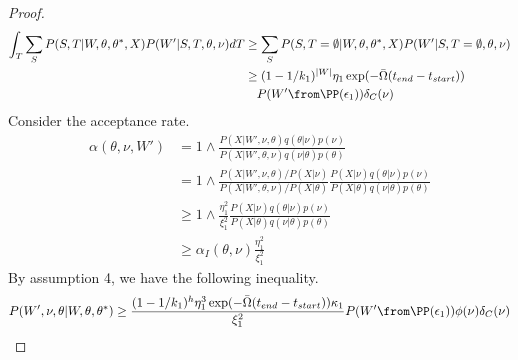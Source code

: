 \begin{proof}
\begin{align*}
\int_T \sum_S P(S,T | W, \theta, \theta^*, X) P(W'| S, T, \theta, \nu)dT &\geq \sum_S P(S, T = \emptyset | W, \theta, \theta^*, X) P(W' | S, T=\emptyset,\theta, \nu)\\
& \geq (1 - 1/k_1)^{|W|}\eta_1 \exp(-\bar{\Omega}(t_{end} - t_{start})) \\
& \quad P(W' \from \PP(\epsilon_1))\delta_C(\nu)
\end{align*}
Consider the acceptance rate.
\begin{align*}
\alpha(\theta, \nu, W') &= 1 \wedge \frac{P(X | W', \nu, \theta) q(\theta|\nu)p(\nu)}{P(X | W', \theta, \nu)q(\nu|\theta)p(\theta)}\\
&= 1 \wedge \frac{P(X|W', \nu, \theta) / P(X|\nu)}{P(X|W', \theta, \nu) / P(X|\theta)} \frac{P(X | \nu) q(\theta|\nu)p(\nu)}{P(X | \theta)q(\nu|\theta)p(\theta)}\\
& \geq 1 \wedge \frac{\eta_1^2}{\xi_1^2} 	\frac{P(X | \nu) q(\theta|\nu)p(\nu)}{P(X | \theta)q(\nu|\theta)p(\theta)}\\
& \geq \alpha_I(\theta, \nu)\frac{\eta_1^2}{\xi_1^2}
\end{align*}
By assumption 4, we have the following inequality.
\begin{align*}
P(W', \nu, \theta | W, \theta, \theta^*) \geq \frac{(1 - 1/k_1)^{h}
\eta_1^3 \exp(-\bar{\Omega}(t_{end} - t_{start}))\kappa_1}{\xi_1^2} 
 P(W'
\from \PP(\epsilon_1))\phi(\nu)\delta_C(\nu)
\end{align*}
\end{proof}

